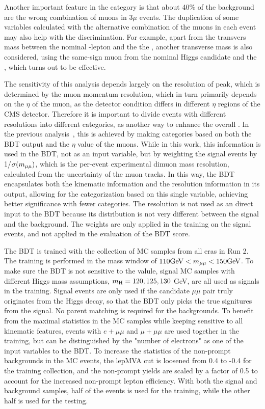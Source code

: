 Another important feature in the \WH category is that about 40\% of the background are the wrong combination of muons in 3$\mu$ events.  
The duplication of some variables calculated with the alternative combination of the muons in each event may also help with the discrimination.
For example, apart from the transvers mass between the nominal \PW-lepton and the the \MHT, 
another transverse mass is also considered, using the same-sign muon from the nominal Higgs candidate and the \MHT,
which turns out to be effective.

The sensitivity of this analysis depends largely on the resolution of \mmm peak, which is determined by the muon momentum resolution,
which in turn primarily depends on the $\eta$ of the muon, as the detector condition differs in different $\eta$ regions of the CMS detector.
Therefore it is important to divide events with different resolutions into different categories, as another way to enhance the overall \SoB.
In the previous \hmm analysis~\cite{PhysRevLett.122.021801, carnesthesis}, this is achieved by making categories based on 
both the BDT output and the $\eta$ value of the muons.  
While in this work, this information is used in the BDT, not as an input variable, but by weighting the signal events by 1/$\sigma(m_{\mu\mu})$,
which is the per-event experimental dimuon mass resolution, calculated from the \pt uncertainty of the muon tracks.
In this way, the BDT encapsulates both the kinematic information and the resolution information in its output, 
allowing for the categorization based on this single variable, achieving better significance with fewer categories.
The resolution is not used as an direct input to the BDT because its distribution is not very different between the signal and the background.
The weights are only applied in the training on the signal events, and not applied in the evaluation of the BDT score.

The BDT is trained with the collection of MC samples from all eras in Run 2.  
The training is performed in the mass window of $110 \mbox{GeV}{} < m_{\mu\mu} < 150 \mbox{GeV}{}$.  
To make sure the BDT is not sensitive to the \mmm valule, signal MC samples with different Higgs mass assumptions, 
$m_{\mathrm{H}} = 120, 125, 130$ GeV, are all used as signals in the training.  
Signal events are only used if the candidate $\mu\mu$ pair truly originates from the Higgs decay, 
so that the BDT only picks the true signitures from the signal. No parent matching is required for the backgrounds.   
To benefit from the maximal statistics in the MC samples while keeping sensitive to all kinematic features, 
events with $e+\mu\mu$ and $\mu+\mu\mu$ are used together in the training, but can be distinguished 
by the "number of electrons" as one of the input variables to the BDT.  
To increase the statistics of the non-prompt backgrounds in the MC events, 
the lepMVA cut is loosened from 0.4 to -0.4 for the training collection, 
and the non-prompt yields are scaled by a factor of 0.5 to account for the increased non-prompt lepton efficiency.  
With both the signal and background samples, half of the events is used for the training, 
while the other half is used for the testing.

